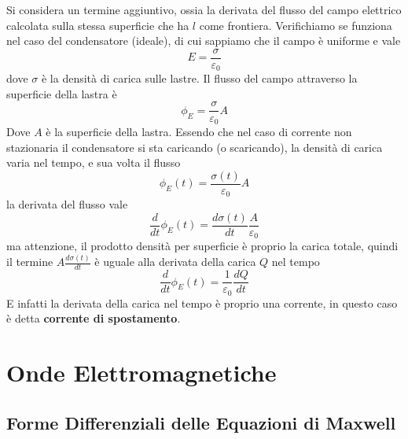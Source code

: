 \documentclass[10pt, letterpaper]{report}
\begin{document}
Si considera un termine aggiuntivo, ossia la derivata del flusso del campo elettrico calcolata sulla stessa superficie che ha $l$ come frontiera.\acc 
Verifichiamo se funziona nel caso del condensatore (ideale), di cui sappiamo che il campo è uniforme e vale $$ E=\frac{\sigma}{\varepsilon_0}$$
dove $\sigma$ è la densità di carica sulle lastre. Il flusso del campo attraverso la superficie della lastra è $$ \phi_E=\frac{\sigma}{\varepsilon_0}A$$
Dove $A$ è la superficie della lastra. Essendo che nel caso di corrente non stazionaria il condensatore si sta caricando (o scaricando), la densità di carica varia nel tempo, e sua volta il flusso 
$$ \phi_E(t)=\frac{\sigma(t)}{\varepsilon_0}A$$
la derivata del flusso vale 
$$ \frac{d}{dt}\phi_E(t)=\frac{d\sigma(t)}{dt}\frac{A}{\varepsilon_0}$$
ma attenzione, il prodotto densità per superficie è proprio la carica totale, quindi il termine $A\frac{d\sigma(t)}{dt}$ è uguale alla derivata della carica $Q$ nel tempo 
$$ \frac{d}{dt}\phi_E(t)=\frac{1}{\varepsilon_0}\frac{dQ}{dt}$$
E infatti la derivata della carica nel tempo è proprio una corrente, in questo caso è detta \textbf{corrente di spostamento}.
\chapter{Onde Elettromagnetiche}
\section{Forme Differenziali delle Equazioni di Maxwell}
\end{document}

